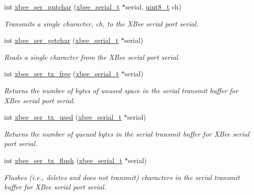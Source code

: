 \begin{DoxyCompactItemize}
int \hyperlink{group__xbee__serial_ga86fea2345efb8bf9424228f0979b1849}{xbee\+\_\+ser\+\_\+putchar} (\hyperlink{structxbee__serial__t}{xbee\+\_\+serial\+\_\+t} $\ast$serial, \hyperlink{group__hal__dos_gae1affc9ca37cfb624959c866a73f83c2}{uint8\+\_\+t} ch)
\begin{DoxyCompactList}\small\item\em Transmits a single character, {\itshape ch}, to the X\+Bee serial port {\itshape serial}. \end{DoxyCompactList}\item 
int \hyperlink{group__xbee__serial_gaeeb38154313a44f86146cdcfe08e7d08}{xbee\+\_\+ser\+\_\+getchar} (\hyperlink{structxbee__serial__t}{xbee\+\_\+serial\+\_\+t} $\ast$serial)
\begin{DoxyCompactList}\small\item\em Reads a single character from the X\+Bee serial port {\itshape serial}. \end{DoxyCompactList}\item 
int \hyperlink{group__xbee__serial_ga3ad8f378b572d6fec982f1086bd3b94f}{xbee\+\_\+ser\+\_\+tx\+\_\+free} (\hyperlink{structxbee__serial__t}{xbee\+\_\+serial\+\_\+t} $\ast$serial)
\begin{DoxyCompactList}\small\item\em Returns the number of bytes of unused space in the serial transmit buffer for X\+Bee serial port {\itshape serial}. \end{DoxyCompactList}\item 
int \hyperlink{group__xbee__serial_gaabf70934d186354cde4ac14ed27d1bd2}{xbee\+\_\+ser\+\_\+tx\+\_\+used} (\hyperlink{structxbee__serial__t}{xbee\+\_\+serial\+\_\+t} $\ast$serial)
\begin{DoxyCompactList}\small\item\em Returns the number of queued bytes in the serial transmit buffer for X\+Bee serial port {\itshape serial}. \end{DoxyCompactList}\item 
int \hyperlink{group__xbee__serial_ga05308d37301d27715f1e1308b7189220}{xbee\+\_\+ser\+\_\+tx\+\_\+flush} (\hyperlink{structxbee__serial__t}{xbee\+\_\+serial\+\_\+t} $\ast$serial)
\begin{DoxyCompactList}\small\item\em Flushes (i.\+e., deletes and does not transmit) characters in the serial transmit buffer for X\+Bee serial port {\itshape serial}. \end{DoxyCompactList}\item 

\end{DoxyCompactItemize}
